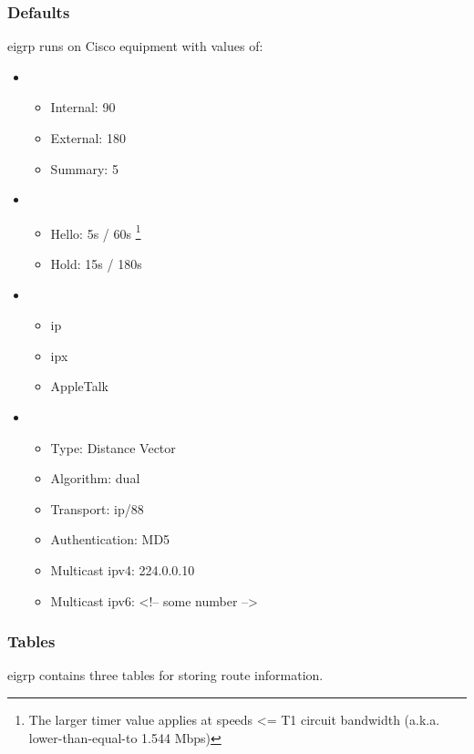 \subsubsection{Defaults}

\gls{eigrp} runs on Cisco equipment with values of:
\begin{itemize}
    \item {}
    \begin{itemize}
        \item Internal: 90
        \item External: 180
        \item Summary: 5
    \end{itemize}
    \item {}
    \begin{itemize}
        \item Hello: 5s / 60s \footnote{The larger timer value applies at speeds <= T1 circuit bandwidth (a.k.a. lower-than-equal-to 1.544 Mbps)}
        \item Hold: 15s / 180s
    \end{itemize}
    \item {}
    \begin{itemize}
        \item \gls{ip}
        \item \gls{ipx}
        \item AppleTalk
    \end{itemize}
    \item {}
    \begin{itemize}
        \item Type: Distance Vector
        \item Algorithm: \gls{dual}
        \item Transport: \gls{ip}/88
        \item Authentication: MD5
        \item Multicast \gls{ipv4}: 224.0.0.10
        \item Multicast \gls{ipv6}: <!-- some number -->
    \end{itemize}
\end{itemize}

\subsubsection{Tables}

\gls{eigrp} contains three tables for storing route information.


